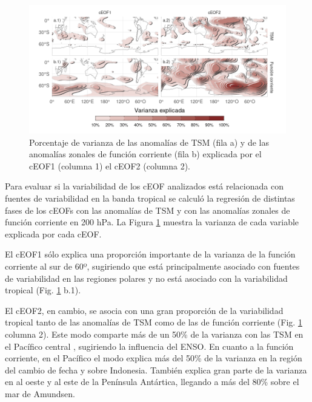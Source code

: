 \documentclass[12pt,oneside,a4paper]{reedthesis}
\begin{document}
\begin{figure}

{\centering \includegraphics{figures/20-ceofs/psi-sst-explained-variance-1} 

}

\caption{Porcentaje de varianza de las anomalías de TSM (fila a) y de las anomalías zonales de función corriente (fila b) explicada por el cEOF1 (columna 1) el cEOF2 (columna 2).}\label{fig:psi-sst-explained-variance}
\end{figure}

Para evaluar si la variabilidad de los cEOF analizados está relacionada con fuentes de variabilidad en la banda tropical se calculó la regresión de distintas fases de los cEOFs con las anomalías de TSM y con las anomalías zonales de función corriente en 200 hPa.
La Figura \ref{fig:psi-sst-explained-variance} muestra la varianza de cada variable explicada por cada cEOF.

El cEOF1 sólo explica una proporción importante de la varianza de la función corriente al sur de 60º, sugiriendo que está principalmente asociado con fuentes de variabilidad en las regiones polares y no está asociado con la variabilidad tropical (Fig. \ref{fig:psi-sst-explained-variance} b.1).

El cEOF2, en cambio, se asocia con una gran proporción de la variabilidad tropical tanto de las anomalías de TSM como de las de función corriente (Fig. \ref{fig:psi-sst-explained-variance} columna 2).
Este modo comparte más de un 50\% de la varianza con las TSM en el Pacífico central , sugiriendo la influencia del ENSO.
En cuanto a la función corriente, en el Pacífico el modo explica más del 50\% de la varianza en la región del cambio de fecha y sobre Indonesia.
También explica gran parte de la varianza en al oeste y al este de la Península Antártica, llegando a más del 80\% sobre el mar de Amundsen.
\end{document}

